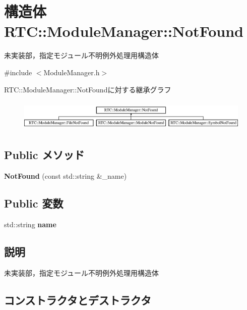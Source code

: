 \section{構造体 RTC::ModuleManager::NotFound}
\label{structRTC_1_1ModuleManager_1_1NotFound}


未実装部，指定モジュール不明例外処理用構造体  




{\ttfamily \#include $<$ModuleManager.h$>$}

RTC::ModuleManager::NotFoundに対する継承グラフ\begin{figure}[H]
\begin{center}
\leavevmode
\includegraphics[height=1.51762cm]{structRTC_1_1ModuleManager_1_1NotFound}
\end{center}
\end{figure}
\subsection*{Public メソッド}
\begin{DoxyCompactItemize}
\item 
{\bf NotFound} (const std::string \&\_\-name)
\end{DoxyCompactItemize}
\subsection*{Public 変数}
\begin{DoxyCompactItemize}
\item 
std::string {\bf name}
\end{DoxyCompactItemize}


\subsection{説明}
未実装部，指定モジュール不明例外処理用構造体 

\subsection{コンストラクタとデストラクタ}
